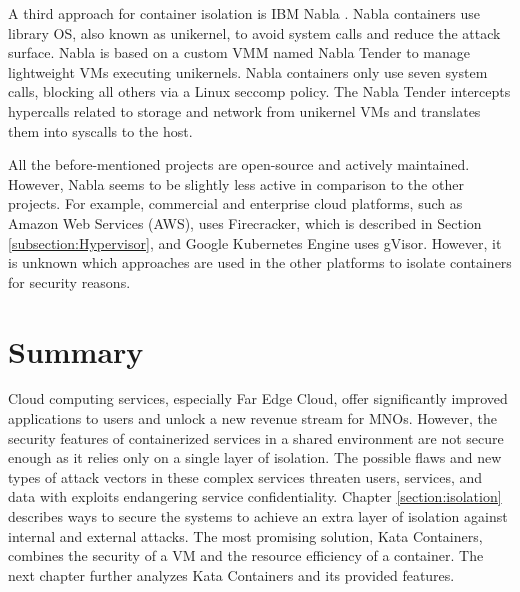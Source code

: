 A third approach for container isolation is IBM Nabla \cite{Nabla}. Nabla containers use library OS, also known as unikernel, to avoid system calls and reduce the attack surface. Nabla is based on a custom VMM named Nabla Tender to manage lightweight VMs executing unikernels. Nabla containers only use seven system calls, blocking all others via a Linux seccomp policy. The Nabla Tender intercepts hypercalls related to storage and network from unikernel VMs and translates them into syscalls to the host. \cite{Debab2021}

All the before-mentioned projects are open-source and actively maintained. However, Nabla seems to be slightly less active in comparison to the other projects. For example, commercial and enterprise cloud platforms, such as Amazon Web Services (AWS), uses Firecracker, which is described in Section \ref{subsection:Hypervisor}, and Google Kubernetes Engine uses gVisor. However, it is unknown which approaches are used in the other platforms to isolate containers for security reasons.

\section{Summary}

Cloud computing services, especially Far Edge Cloud, offer significantly improved applications to users and unlock a new revenue stream for MNOs. However, the security features of containerized services in a shared environment are not secure enough as it relies only on a single layer of isolation. The possible flaws and new types of attack vectors in these complex services threaten users, services, and data with exploits endangering service confidentiality. Chapter \ref{section:isolation} describes ways to secure the systems to achieve an extra layer of isolation against internal and external attacks. The most promising solution, Kata Containers, combines the security of a VM and the resource efficiency of a container. The next chapter further analyzes Kata Containers and its provided features.